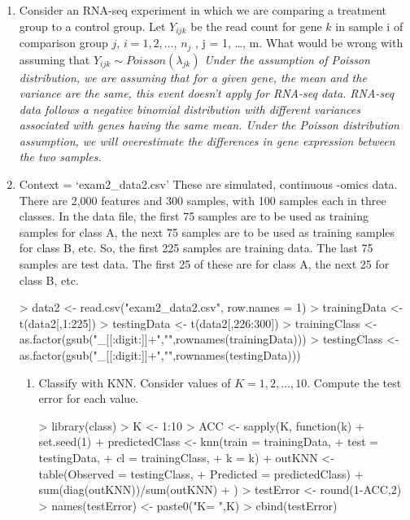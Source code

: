 \documentclass[12pt,a4paper]{paper}
\begin{document}
\begin{enumerate}
\item Consider an RNA-seq experiment in which we are comparing a treatment group to a control group. Let $Y_{ijk}$ be the read count for gene $k$ in sample i of comparison group $j$, $i = 1, 2,\dots$, $n_{j}$ , j = 1, \dots, m. What would be wrong with assuming that $Y_{ijk} \sim Poisson(\lambda_{jk})$ \textit{Under the assumption of Poisson distribution, we are assuming that for a given gene, the mean and the variance are the same, this event doesn't apply for RNA-seq data. RNA-seq data follows a negative binomial distribution with different variances associated with genes having the same mean. Under the Poisson distribution assumption, we will overestimate the differences in gene expression between the two samples.}
\item Context = `exam2\_data2.csv' These are simulated, continuous -omics data. There are 2,000 features and 300 samples, with 100 samples each in three classes. In the data file, the first 75 samples are to be used as training samples for class A, the next 75 samples are to be used as training samples for class B, etc. So, the first 225 samples are training data. The last 75 samples are test data. The first 25 of these are for class A, the next 25 for class B, etc.
\begin{Schunk}
\begin{Sinput}
> data2 <- read.csv("exam2_data2.csv", row.names = 1)
> trainingData <- t(data2[,1:225])
> testingData <- t(data2[,226:300])
> trainingClass <- as.factor(gsub("_[[:digit:]]+","",rownames(trainingData)))
> testingClass <- as.factor(gsub("_[[:digit:]]+","",rownames(testingData)))
\end{Sinput}
\end{Schunk}
\begin{enumerate}
\item Classify with KNN. Consider values of $K = 1, 2, \dots, 10$. Compute the test error for each value.
\begin{Schunk}
\begin{Sinput}
> library(class)
> K <- 1:10
> ACC <- sapply(K, function(k){
+   set.seed(1)
+   predictedClass <- knn(train = trainingData, 
+                       test = testingData, 
+                       cl = trainingClass, 
+                       k = k)
+ outKNN <- table(Observed = testingClass, 
+                 Predicted = predictedClass)
+ sum(diag(outKNN))/sum(outKNN)
+ })
> testError <- round(1-ACC,2)
> names(testError) <- paste0("K= ",K)
> cbind(testError)
\end{Sinput}

\end{Schunk}
\end{enumerate}
\end{enumerate}
\end{document}
